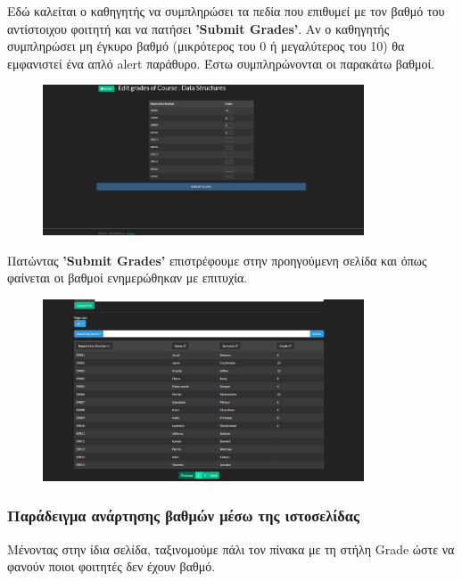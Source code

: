 \documentclass[12pt]{article}
\begin{document}
	Εδώ καλείται ο καθηγητής να συμπληρώσει τα πεδία που επιθυμεί με τον βαθμό του αντίστοιχου φοιτητή και να πατήσει \textbf{'Submit Grades'}. Αν ο καθηγητής συμπληρώσει μη έγκυρο βαθμό (μικρότερος του 0 ή μεγαλύτερος του 10) θα εμφανιστεί ένα απλό alert παράθυρο. Έστω συμπληρώνονται οι παρακάτω βαθμοί.
	
	\begin{figure}[H]
		\centering
		\includegraphics[width=0.85\textwidth]{edits234.png}
		\caption{}
		\label{fig:emptyView}
	\end{figure}

	Πατώντας \textbf{'Submit Grades'} επιστρέφουμε στην προηγούμενη σελίδα και όπως φαίνεται οι βαθμοί ενημερώθηκαν με επιτυχία.
	
	\begin{figure}[H]
		\centering
		\includegraphics[width=0.85\textwidth]{newstudents.png}
		\caption{}
		\label{fig:emptyView}
	\end{figure}

	\subsubsection{Παράδειγμα ανάρτησης βαθμών μέσω της ιστοσελίδας}
	
	Μένοντας στην ίδια σελίδα, ταξινομούμε πάλι τον πίνακα με τη στήλη Grade ώστε να φανούν ποιοι φοιτητές δεν έχουν βαθμό.
	
\end{document}
